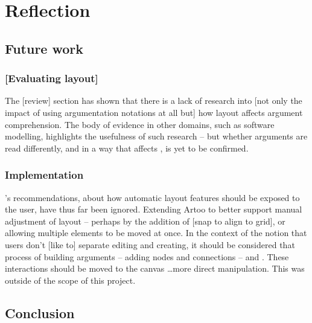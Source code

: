 \chapter{Reflection}


\section{Future work}

\subsection{[Evaluating layout]}

The [review] section has shown that there is a lack of research into [not only the impact of using argumentation notations at all but] how layout affects argument comprehension. The body of evidence in other domains, such as software modelling, highlights the usefulness of such research -- but whether arguments are read differently, and in a way that affects , is yet to be confirmed.


\subsection{Implementation}

\citet{5674033}'s recommendations, about how automatic layout features should be exposed to the user, have thus far been ignored. Extending Artoo to better support manual adjustment of layout -- perhaps by the addition of [snap to align to grid], or allowing multiple elements to be moved at once. In the context of the notion that users don't [like to] separate editing and creating, it should be considered that  process of building arguments -- adding nodes and connections -- and  . These interactions should be moved to the canvas \ldots more direct manipulation. This was outside of the scope of this project.

\section{Conclusion}

